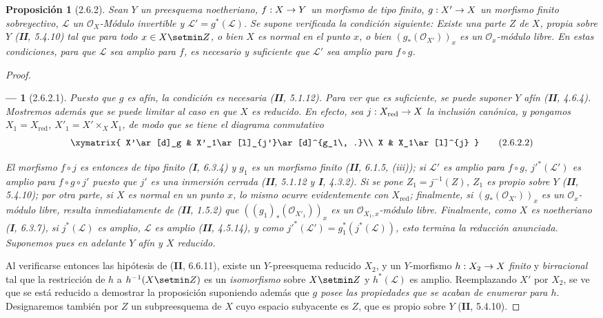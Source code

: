 \documentclass[10pt,oneside,openany]{book}
\theoremstyle{egaenv}\newtheorem*{env}{---}
\theoremstyle{egastatement}
\newtheorem*{proposition}{Proposición}
\theoremstyle{egadescription}
\renewcommand{\to}{\mathchoice{\longrightarrow}{\rightarrow}{\rightarrow}{\rightarrow}}
\begin{document}
\begin{proposition}[2.6.2]
\label{III.2.6.2-fr}
Sean $Y$ un preesquema noetheriano, $f:X\to Y$ un morfismo de tipo
finito, $g:X'\to X$ un morfismo finito sobreyectivo, $\mathcal L$ un
$\mathcal O_X$-Módulo invertible y $\mathcal L'=g^*(\mathcal L)$. Se
supone verificada la condición siguiente: Existe una parte $Z$ de
$X$, propia sobre $Y$ (\textbf{II}, 5.4.10) tal que para todo $x\in X\setmin Z$, o bien
$X$ es normal en el punto $x$, o bien $(g_*(\mathcal O_{X'}))_x$ es un
$\mathcal O_x$-módulo libre. En estas condiciones, para que $\mathcal L$
sea amplio para $f$, es necesario y suficiente que $\mathcal L'$ sea amplio
para $f\circ g$.
\end{proposition}

\begin{proof}
\begin{env}[2.6.2.1]
\label{III.2.6.2.1-fr}
Puesto que $g$ es afín, la condición es necesaria (\textbf{II}, 5.1.12). Para
ver que es suficiente, se puede suponer $Y$ afín (\textbf{II}, 4.6.4).
Mostremos además que se puede limitar al caso en que $X$ es \emph{reducido}. En
efecto, sea $j:X_{\mathrm{red}}\to X$ la inclusión canónica, y pongamos
$X_1=X_{\mathrm{red}}$, $X'_1=X'\times_X X_1$, de modo que se tiene el
diagrama conmutativo
\[
\xymatrix{
X'\ar[d]_g & X'_1\ar[l]_{j'}\ar[d]^{g_1\, .}\\
X & X_1\ar[l]^{j}
}
\tag{2.6.2.2}\label{III.2.6.2.2-fr}
\]

El morfismo $f\circ j$ es entonces de tipo finito (\textbf{I}, 6.3.4) y $g_1$ es
un morfismo finito (\textbf{II}, 6.1.5, (iii)); si $\mathcal L'$ es amplio para
$f\circ g$, $j'^*(\mathcal L')$ es amplio para $f\circ g\circ j'$ puesto que
$j'$ es una inmersión cerrada (\textbf{II}, 5.1.12 y \textbf{I}, 4.3.2). Si se pone
$Z_1=j^{-1}(Z)$, $Z_1$ es propio sobre $Y$ (\textbf{II}, 5.4.10); por otra parte,
si $X$ es normal en un punto $x$, lo mismo ocurre evidentemente con
$X_{\mathrm{red}}$; finalmente, si $(g_*(\mathcal O_{X'}))_x$ es un
$\mathcal O_x$-módulo libre, resulta inmediatamente de (\textbf{II}, 1.5.2) que
$((g_1)_*(\mathcal O_{X'_1}))_x$ es un $\mathcal O_{X_1,x}$-módulo
libre. Finalmente, como $X$ es noetheriano (\textbf{I}, 6.3.7), si
$j^*(\mathcal L)$ es amplio, $\mathcal L$ es amplio (\textbf{II}, 4.5.14), y
como $j'^*(\mathcal L')=g_1^*(j^*(\mathcal L))$, esto termina la
reducción anunciada. Suponemos pues en adelante $Y$ \emph{afín} y $X$
\emph{reducido}.
\end{env}

Al verificarse entonces las hipótesis de (\textbf{II}, 6.6.11), existe un
$Y$-preesquema reducido $X_2$, y un $Y$-morfismo $h:X_2\to X$ \emph{finito} y
\emph{birracional} tal que la restricción de $h$ a $h^{-1}(X\setmin Z)$ es un
\emph{isomorfismo} sobre $X\setmin Z$ y $h^*(\mathcal L)$ es amplio. Reemplazando
$X'$ por $X_2$, se ve que se está reducido a demostrar la proposición
suponiendo además que \emph{$g$ posee las propiedades que se acaban de
enumerar para $h$}. Designaremos también por $Z$ un subpreesquema de
$X$ cuyo espacio subyacente es $Z$, que es propio sobre $Y$
(\textbf{II}, 5.4.10).


\end{proof}
\end{document}
